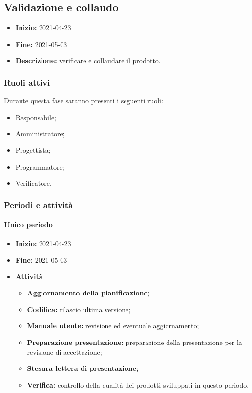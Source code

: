 
\subsection{Validazione e collaudo} \label{_pianificazioneValidazioneCollaudo}
\begin{itemize}
    \item [] \textbf{Inizio:} 2021-04-23
    \item [] \textbf{Fine:} 2021-05-03
    \item [] \textbf{Descrizione:} verificare e collaudare il prodotto.
\end{itemize}

\subsubsection{Ruoli attivi}
Durante questa fase saranno presenti i seguenti ruoli:
\begin{itemize}
    \item Responsabile;
    \item Amministratore;
    \item Progettista;
    \item Programmatore;
    \item Verificatore.
\end{itemize}

\subsubsection{Periodi e attività}

\paragraph[Unico periodo]{Unico periodo}
\begin{itemize}
    \item [] \textbf{Inizio:} 2021-04-23
    \item [] \textbf{Fine:} 2021-05-03
    \item [] \textbf{Attività}
          \begin{itemize}
              \item \textbf{Aggiornamento della pianificazione;}
              \item \textbf{Codifica:} rilascio ultima versione;
              \item \textbf{Manuale utente:} revisione ed eventuale aggiornamento;
              \item \textbf{Preparazione presentazione:} preparazione della presentazione per la revisione di accettazione;
              \item \textbf{Stesura lettera di presentazione;}
              \item \textbf{Verifica:} controllo della qualità dei prodotti sviluppati in questo periodo.
          \end{itemize}
\end{itemize}

